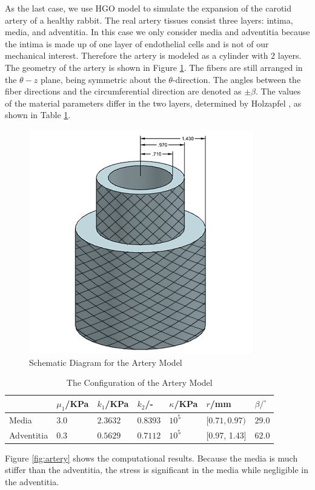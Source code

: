 As the last case, we use HGO model to simulate the expansion of the carotid artery of a healthy rabbit. The real artery tissues consist three layers: intima, media, and adventitia. In this case we only consider media and adventitia because the intima is made up of one layer of endothelial cells and is not of our mechanical interest. Therefore the artery is modeled as a cylinder with $2$ layers. The geometry of the artery is shown in Figure \ref{fig:vessel_schematic3}. The fibers are still arranged in the $\theta-z$ plane, being symmetric about the $\theta$-direction. The angles between the fiber directions and the circumferential direction are denoted as $\pm\beta$. The values of the material parameters differ in the two layers, determined by Holzapfel \cite{Holzapfel2} , as shown in Table \ref{table:artery}. 

\begin{figure}[H]
\centering
\includegraphics[width=.3\textwidth]{./figures/vessel_schematic3.png}
\caption{Schematic Diagram for the Artery Model}
\label{fig:vessel_schematic3}
\end{figure}

\begin{table}[H]
\centering
\caption{The Configuration of the Artery Model}
\label{table:artery}
\begin{tabular}{ l l l l l l l}
\hline
& $\mu_1$/KPa & $k_1$/KPa & $k_2$/- & $\kappa$/KPa & $r$/mm & $\beta/^\circ$ \\
 \hline
 Media &   $3.0$ & $2.3632$ & $0.8393$ & $10^5$ & $[0.71, 0.97)$ & $29.0$\\
 Adventitia & $0.3$ & $0.5629$ & $0.7112$ & $10^5$ & [0.97, 1.43] & $62.0$\\
 \hline
\end{tabular}
\end{table}

Figure \ref{fig:artery} shows the computational results. Because the media is much stiffer than the adventitia, the stress is significant in the media while negligible in the adventitia.


